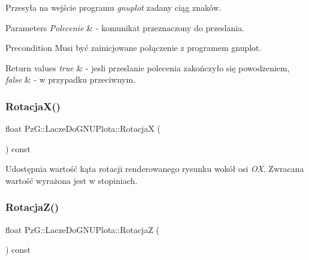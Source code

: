 Przesyła na wejście programu {\itshape gnuplot} zadany ciąg znaków. 
\begin{DoxyParams}{Parameters}
{\em Polecenie} & -\/ komunikat przeznaczony do przeslania.\\
\hline
\end{DoxyParams}
\begin{DoxyPrecond}{Precondition}
Musi być zainicjowane połączenie z programem gnuplot.
\end{DoxyPrecond}

\begin{DoxyRetVals}{Return values}
{\em true} & -\/ jesli przeslanie polecenia zakończyło się powodzeniem, \\
\hline
{\em false} & -\/ w przypadku przeciwnym. \\
\hline
\end{DoxyRetVals}
\mbox{\label{classPzG_1_1LaczeDoGNUPlota_addf0b844f626f3f5220de70efcbbdbb3}} 
\subsubsection{\texorpdfstring{Rotacja\+X()}{RotacjaX()}}
{\footnotesize\ttfamily float Pz\+G\+::\+Lacze\+Do\+G\+N\+U\+Plota\+::\+RotacjaX (\begin{DoxyParamCaption}{ }\end{DoxyParamCaption}) const\hspace{0.3cm}{\ttfamily [inline]}}

Udostępnia wartość kąta rotacji renderowanego rysunku wokół osi {\itshape OX}. Zwracana wartość wyrażona jest w stopiniach. \mbox{\label{classPzG_1_1LaczeDoGNUPlota_a9dac73754fab10644b287756003e9c79}} 
\subsubsection{\texorpdfstring{Rotacja\+Z()}{RotacjaZ()}}
{\footnotesize\ttfamily float Pz\+G\+::\+Lacze\+Do\+G\+N\+U\+Plota\+::\+RotacjaZ (\begin{DoxyParamCaption}{ }\end{DoxyParamCaption}) const\hspace{0.3cm}{\ttfamily [inline]}}

